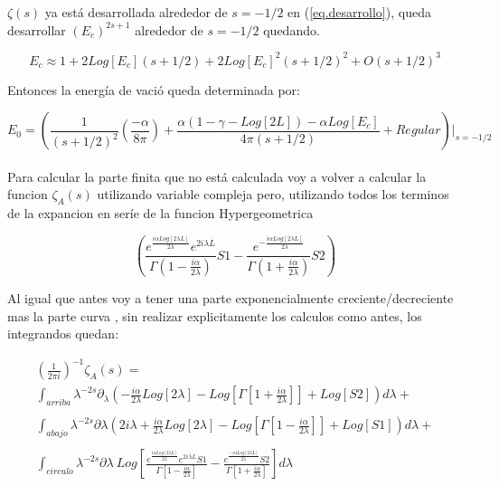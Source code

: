 $\zeta (s)$ ya está desarrollada alrededor de $s=-1/2$ en (\ref{eq.desarrollo}), queda desarrollar $(E_c) ^{2s+1} $ alrededor de $s=-1/2$ quedando.

\begin{equation}
    E _c \approx 
    1 + 2 Log[E_c] (s + 1/2) +
    2 Log[E_c] ^2 (s+1/2) ^2 + 
    O (s+1/2)^3
\end{equation}

Entonces la energía de vació queda determinada por:

\begin{equation}
    E _0 =
    \left(
    \frac{1}{(s+1/2)^2} 
    \left(
    \frac{- \alpha}{8 \pi}
    \right)+
    \frac{
    \alpha(1 -\gamma-Log[2L]) - 
    \alpha Log[E_c] 
    }{4 \pi (s+1/2)} 
     + Regular
    \right) | _{s=-1/2}
\end{equation}\\



Para calcular la parte finita que no está calculada voy a volver a calcular la funcion $\zeta _A (s) $ utilizando variable compleja pero, utilizando todos los terminos de la expancion en seríe de la funcion Hypergeometrica

\begin{equation}
 \left(
 \frac{e ^{  \frac{i \alpha Log[2 \lambda L ]}{2 \lambda } } e ^{2 i \lambda L } }
 {\Gamma ( 1 - \frac{i \alpha}{2 \lambda} )} S1 - 
 \frac{e ^{ -  \frac{i \alpha Log[2 \lambda L ]}{2 \lambda } } }
 	  {\Gamma (1 + \frac{i \alpha}{2 \lambda})} S2 
 \right)
\end{equation}

Al igual que antes voy a tener una parte exponencialmente creciente/decreciente mas la parte curva , sin realizar explicitamente los calculos como antes, los integrandos quedan:

\begin{equation}
\begin{array}{c}
 \left( \frac{1}{2 \pi i} \right) ^{-1 } \zeta _A (s) = \\
\int _{arriba} \lambda ^{-2s } \partial _{\lambda}
	\left(
		- \frac{i \alpha}{2 \lambda} Log [2 \lambda] - Log[\Gamma [1 + \frac{i \alpha}{2 \lambda}]] +
		Log[ S2 ]
		\right) d \lambda
	+ \\ \\
\int _{abajo} \lambda ^{-2s } \partial \lambda
	\left(
		2 i \lambda + \frac{i \alpha}{2 \lambda} Log [2 \lambda] - 
		Log[\Gamma [1 - \frac{i \alpha}{2 \lambda}]] +
		Log[ S1 ]
		\right)	d \lambda
	+ \\ \\
\int _{circulo} \lambda ^{-2s } \partial \lambda \ Log \left[
					\frac{e ^{\frac{i \alpha Log[2 \lambda L ]}{2 \lambda}} e ^{2 i \lambda L} S1}
					{\Gamma \left[ 1 - \frac{i \alpha}{2 \lambda} \right]} - 
					\frac{e ^{\frac{-i \alpha Log[2 \lambda L ]}{2 \lambda}} S2}
					{\Gamma \left[ 1 + \frac{i \alpha}{2 \lambda} \right]}					
					\right] d \lambda
\end{array}
\end{equation}

